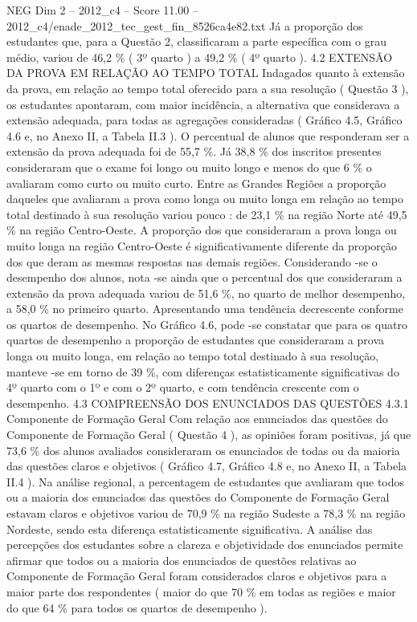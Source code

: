 \begin{textsample}{NEG Dim 2 – 2012\_c4 – Score 11.00 – 2012\_c4/enade\_2012\_tec\_gest\_fin\_8526ca4e82.txt}
Já a proporção dos estudantes que, para a Questão 2, classificaram a parte específica com o grau médio, variou de 46,2 \% ( 3º quarto ) a 49,2 \% ( 4º quarto ). 4.2 EXTENSÃO DA PROVA EM RELAÇÃO AO TEMPO TOTAL Indagados quanto à extensão da prova, em relação ao tempo total oferecido para a sua resolução ( Questão 3 ), os estudantes apontaram, com maior incidência, a alternativa que considerava a extensão adequada, para todas as agregações consideradas ( Gráfico 4.5, Gráfico 4.6 e, no Anexo II, a Tabela II.3 ).
O percentual de alunos que responderam ser a extensão da prova adequada foi de 55,7 \%.
Já 38,8 \% dos inscritos presentes consideraram que o exame foi longo ou muito longo e menos do que 6 \% o avaliaram como curto ou muito curto.
Entre as Grandes Regiões a proporção daqueles que avaliaram a prova como longa ou muito longa em relação ao tempo total destinado à sua resolução variou pouco : de 23,1 \% na região Norte até 49,5 \% na região Centro-Oeste.
A proporção dos que consideraram a prova longa ou muito longa na região Centro-Oeste é significativamente diferente da proporção dos que deram as mesmas respostas nas demais regiões.
Considerando -se o desempenho dos alunos, nota -se ainda que o percentual dos que consideraram a extensão da prova adequada variou de 51,6 \%, no quarto de melhor desempenho, a 58,0 \% no primeiro quarto.
Apresentando uma tendência decrescente conforme os quartos de desempenho.
No Gráfico 4.6, pode -se constatar que para os quatro quartos de desempenho a proporção de estudantes que consideraram a prova longa ou muito longa, em relação ao tempo total destinado à sua resolução, manteve -se em torno de 39 \%, com diferenças estatisticamente significativas do 4º quarto com o 1º e com o 2º quarto, e com tendência crescente com o desempenho. 4.3 COMPREENSÃO DOS ENUNCIADOS DAS QUESTÕES 4.3.1 Componente de Formação Geral Com relação aos enunciados das questões do Componente de Formação Geral ( Questão 4 ), as opiniões foram positivas, já que 73,6 \% dos alunos avaliados consideraram os enunciados de todas ou da maioria das questões claros e objetivos ( Gráfico 4.7, Gráfico 4.8 e, no Anexo II, a Tabela II.4 ).
Na análise regional, a percentagem de estudantes que avaliaram que todos ou a maioria dos enunciados das questões do Componente de Formação Geral estavam claros e objetivos variou de 70,9 \% na região Sudeste a 78,3 \% na região Nordeste, sendo esta diferença estatisticamente significativa.
A análise das percepções dos estudantes sobre a clareza e objetividade dos enunciados permite afirmar que todos ou a maioria dos enunciados de questões relativas ao Componente de Formação Geral foram considerados claros e objetivos para a maior parte dos respondentes ( maior do que 70 \% em todas as regiões e maior do que 64 \% para todos os quartos de desempenho ).

\end{textsample}
